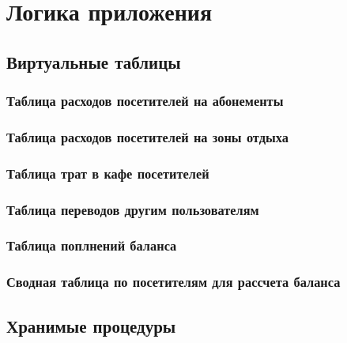 \documentclass[a4paper]{article}
\begin{document}
\section{Логика приложения}
\subsection{Виртуальные таблицы}
\subsubsection{Таблица расходов посетителей на абонементы}



\subsubsection{Таблица расходов посетителей на зоны отдыха}



\subsubsection{Таблица трат в кафе посетителей}



\subsubsection{Таблица переводов другим пользователям}



\subsubsection{Таблица поплнений баланса}



\subsubsection{Сводная таблица по посетителям для рассчета баланса}



\subsection{Хранимые процедуры}
\end{document}
